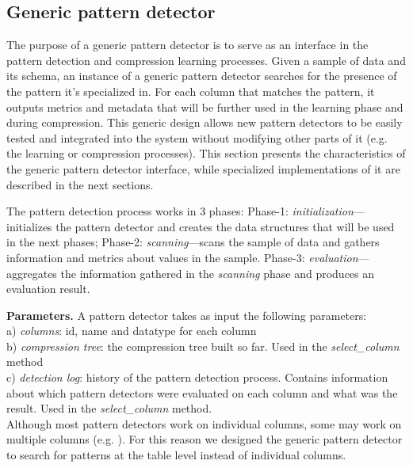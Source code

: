 \subsection{Generic pattern detector}
\label{subsec:genericpd}





% 

The purpose of a generic pattern detector is to serve as an interface in the pattern detection and compression learning processes. Given a sample of data and its schema, an instance of a generic pattern detector searches for the presence of the pattern it's specialized in.  For each column that matches the pattern, it outputs metrics and metadata that will be further used in the learning phase and during compression. This generic design allows new pattern detectors to be easily tested and integrated into the system without modifying other parts of it (e.g. the learning or compression processes). This section presents the characteristics of the generic pattern detector interface, while specialized implementations of it are described in the next sections.

The pattern detection process works in 3 phases: Phase-1: \textit{initialization}---initializes the pattern detector and creates the data structures that will be used in the next phases; Phase-2: \textit{scanning}---scans the sample of data and gathers information and metrics about values in the sample. Phase-3: \textit{evaluation}---aggregates the information gathered in the \textit{scanning} phase and produces an evaluation result.

\textbf{Parameters.} A pattern detector takes as input the following parameters:\\
a) \textit{columns}: id, name and datatype for each column\\
b) \textit{compression tree}: the compression tree built so far. Used in the \textit{select\_column} method\\
c) \textit{detection log}: history of the pattern detection process. Contains information about which pattern detectors were evaluated on each column and what was the result. Used in the \textit{select\_column} method.\\
Although most pattern detectors work on individual columns, some may work on multiple columns (e.g. ). For this reason we designed the generic pattern detector to search for patterns at the table level instead of individual columns.

